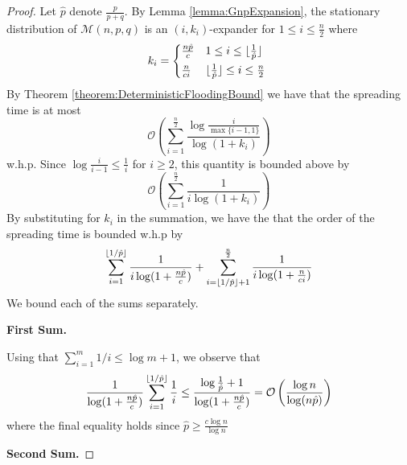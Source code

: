 \begin{proof}
	Let $\hat{p}$ denote $\frac{p}{p+q}$. 
	By Lemma \ref{lemma:GnpExpansion}, the stationary distribution of $\mathcal{M}(n, p, q)$ is an $(i, k_i)$-expander for $1 \leq i \leq \frac{n}{2}$ where 
	\begin{equation*}
		k_i = 
		\begin{cases*}
			\frac{n\hat{p}}{c} & $1 \leq i \leq \floor{\frac{1}{\hat{p}}}$ \\
			\frac{n}{ci} & $\floor{\frac{1}{\hat{p}}} \leq i \leq \frac{n}{2}$
		\end{cases*}
	\end{equation*}
	By Theorem \ref{theorem:DeterministicFloodingBound} we have that the spreading time is at most
	$$
		\mathcal{O}\left(\sum_{i=1}^\frac{n}{2} \frac{\log \frac{i}{\max\{i-1,1\}}}{\log(1+k_i)}\right)
	$$
	w.h.p.
	Since $\log \frac{i}{i-1} \leq \frac{1}{i}$ for $i \geq 2$, %
	this quantity is bounded above by 
	$$
		\mathcal{O}\left(\sum_{i=1}^\frac{n}{2} \frac{1}{i\log(1+k_i)}\right)
	$$
	By substituting for $k_i$ in the summation, we have the that the order of the spreading time is bounded w.h.p by
	$$
		\sum_{i=1}^{\lfloor1/\hat{p}\rfloor} \frac{1}{i\log(1+\frac{n\hat{p}}{c})} 
		+
		\sum_{i=\lfloor1/\hat{p}\rfloor + 1}^\frac{n}{2} \frac{1}{i\log(1+\frac{n}{ci})} 
	$$
	We bound each of the sums separately.

	\textbf{First Sum.}

	Using that $\sum_{i=1}^m 1/i \leq \log m + 1$, %
	we observe that
	$$
		\frac{1}{\log(1+\frac{n\hat{p}}{c})} \sum_{i=1}^{\lfloor1/\hat{p}\rfloor} \frac{1}{i} 
		\leq 
		\frac{\log \frac{1}{\hat{p}} + 1}{\log(1+\frac{n\hat{p}}{c})} 
		= 
		\mathcal{O}\left(\frac{\log n}{\log(n\hat{p})}\right)
	$$
	where the final equality holds since $\hat{p} \geq \frac{c \log n}{\log n}$

	\textbf{Second Sum.}


\end{proof}
